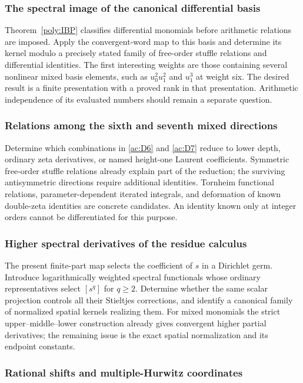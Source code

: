 \documentclass[11pt,a4paper]{article}
\numberwithin{equation}{section}
\theoremstyle{definition}
\theoremstyle{remark}
\begin{document}
\subsubsection{The spectral image of the canonical differential basis}

Theorem~\ref{poly:IBP} classifies differential monomials before arithmetic
relations are imposed. Apply the convergent-word map to this basis and
determine its kernel modulo a precisely stated family of free-order
stuffle relations and differential identities. The first interesting
weights are those containing several nonlinear mixed basis elements,
such as $u_0^2u_1^2$ and $u_1^3$ at weight six. The desired result is a
finite presentation with a proved rank in that presentation. Arithmetic
independence of its evaluated numbers should remain a separate question.

\subsubsection{Relations among the sixth and seventh mixed directions}

Determine which combinations in \eqref{ac:D6} and \eqref{ac:D7}
reduce to lower depth, ordinary zeta derivatives, or named
height-one Laurent coefficients. Symmetric free-order stuffle relations
already explain part of the reduction; the surviving antisymmetric
directions require additional identities. Tornheim functional relations,
parameter-dependent iterated integrals, and deformation of known
double-zeta identities are concrete candidates. An identity known only
at integer orders cannot be differentiated for this purpose.

\subsubsection{Higher spectral derivatives of the residue calculus}

The present finite-part map selects the coefficient of $s$ in a
Dirichlet germ. Introduce logarithmically weighted spectral functionals
whose ordinary representatives select $[s^q]$ for $q\ge2$.
Determine whether the same scalar projection controls all their
Stieltjes corrections, and identify a canonical family of normalized
spatial kernels realizing them. For mixed monomials the strict
upper--middle--lower construction already gives convergent higher
partial derivatives; the remaining issue is the exact spatial
normalization and its endpoint constants.

\subsubsection{Rational shifts and multiple-Hurwitz coordinates}
\end{document}
